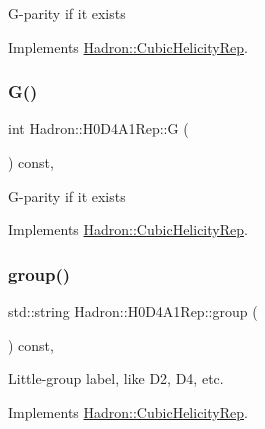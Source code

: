 G-\/parity if it exists 

Implements \mbox{\hyperlink{structHadron_1_1CubicHelicityRep_a50689f42be1e6170aa8cf6ad0597018b}{Hadron\+::\+Cubic\+Helicity\+Rep}}.

\mbox{\label{structHadron_1_1H0D4A1Rep_ab13ff026da1bc59df4b52835038296d5}} 
\subsubsection{\texorpdfstring{G()}{G()}\hspace{0.1cm}{\footnotesize\ttfamily [2/2]}}
{\footnotesize\ttfamily int Hadron\+::\+H0\+D4\+A1\+Rep\+::G (\begin{DoxyParamCaption}{ }\end{DoxyParamCaption}) const\hspace{0.3cm}{\ttfamily [inline]}, {\ttfamily [virtual]}}

G-\/parity if it exists 

Implements \mbox{\hyperlink{structHadron_1_1CubicHelicityRep_a50689f42be1e6170aa8cf6ad0597018b}{Hadron\+::\+Cubic\+Helicity\+Rep}}.

\mbox{\label{structHadron_1_1H0D4A1Rep_abc2f3e6961a83aec1fdfa3909b4925dd}} 
\subsubsection{\texorpdfstring{group()}{group()}\hspace{0.1cm}{\footnotesize\ttfamily [1/3]}}
{\footnotesize\ttfamily std\+::string Hadron\+::\+H0\+D4\+A1\+Rep\+::group (\begin{DoxyParamCaption}{ }\end{DoxyParamCaption}) const\hspace{0.3cm}{\ttfamily [inline]}, {\ttfamily [virtual]}}

Little-\/group label, like D2, D4, etc. 

Implements \mbox{\hyperlink{structHadron_1_1CubicHelicityRep_a101a7d76cd8ccdad0f272db44b766113}{Hadron\+::\+Cubic\+Helicity\+Rep}}.

\mbox{\label{structHadron_1_1H0D4A1Rep_abc2f3e6961a83aec1fdfa3909b4925dd}} 
